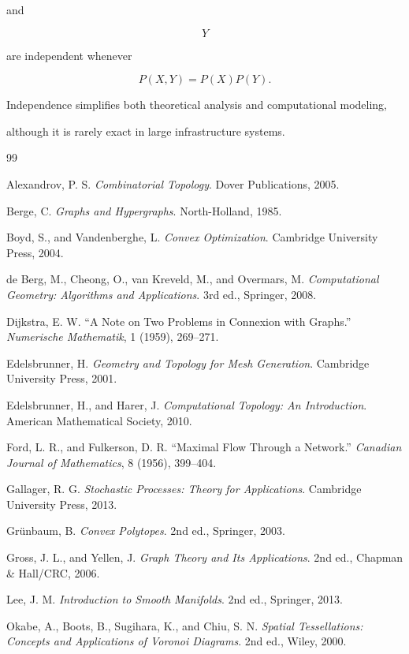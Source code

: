 \documentclass[11pt,fleqn]{book}
\numberwithin{equation}{chapter}
\theoremstyle{plain}
\theoremstyle{definition}
\theoremstyle{remark}
\begin{document}
and

\[
Y
\]

are independent whenever

\[
\boxed{
P(X,Y)
=
P(X)P(Y).
}
\]

Independence simplifies both theoretical analysis and computational
modeling,

although it is rarely exact in large infrastructure systems.

\newpage

\begin{thebibliography}{99}

Alexandrov, P. S.
\emph{Combinatorial Topology}.
Dover Publications, 2005.

Berge, C.
\emph{Graphs and Hypergraphs}.
North-Holland, 1985.

Boyd, S., and Vandenberghe, L.
\emph{Convex Optimization}.
Cambridge University Press, 2004.

de Berg, M., Cheong, O., van Kreveld, M., and Overmars, M.
\emph{Computational Geometry: Algorithms and Applications}.
3rd ed., Springer, 2008.

Dijkstra, E. W.
``A Note on Two Problems in Connexion with Graphs.''
\emph{Numerische Mathematik},
1 (1959), 269--271.

Edelsbrunner, H.
\emph{Geometry and Topology for Mesh Generation}.
Cambridge University Press, 2001.

Edelsbrunner, H., and Harer, J.
\emph{Computational Topology: An Introduction}.
American Mathematical Society, 2010.

Ford, L. R., and Fulkerson, D. R.
``Maximal Flow Through a Network.''
\emph{Canadian Journal of Mathematics},
8 (1956), 399--404.

Gallager, R. G.
\emph{Stochastic Processes: Theory for Applications}.
Cambridge University Press, 2013.

Grünbaum, B.
\emph{Convex Polytopes}.
2nd ed., Springer, 2003.

Gross, J. L., and Yellen, J.
\emph{Graph Theory and Its Applications}.
2nd ed., Chapman \& Hall/CRC, 2006.

Lee, J. M.
\emph{Introduction to Smooth Manifolds}.
2nd ed., Springer, 2013.

Okabe, A., Boots, B., Sugihara, K., and Chiu, S. N.
\emph{Spatial Tessellations: Concepts and Applications of Voronoi Diagrams}.
2nd ed., Wiley, 2000.


\end{thebibliography}
\end{document}
